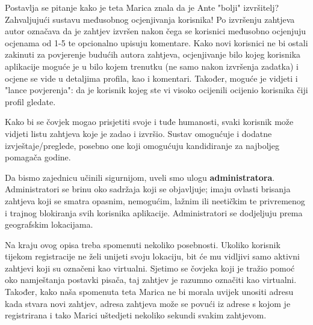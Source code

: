 	Postavlja se pitanje kako je teta Marica znala da je Ante "bolji" izvršitelj? Zahvaljujući sustavu međusobnog ocjenjivanja korisnika! Po izvršenju zahtjeva autor označava da je zahtjev izvršen nakon čega se korisnici međusobno ocjenjuju ocjenama od 1-5 te opcionalno upisuju komentare. Kako novi korisnici ne bi ostali zakinuti za povjerenje budućih autora zahtjeva, ocjenjivanje bilo kojeg korisnika aplikacije moguće je u bilo kojem trenutku (ne samo nakon izvršenja zadatka) i ocjene se vide u detaljima profila, kao i komentari. Također, moguće je vidjeti i
	"lance povjerenja": da je korisnik kojeg ste vi visoko ocijenili ocijenio korisnika
	čiji profil gledate.
	
	Kako bi se čovjek mogao prisjetiti svoje i tuđe humanosti, svaki korisnik može vidjeti listu zahtjeva koje je zadao i izvršio. Sustav
	omogućuje i dodatne izvještaje/preglede, posebno one koji omogućuju
	kandidiranje za najboljeg pomagača godine.
	
	Da bismo zajednicu učinili sigurnijom, uveli smo ulogu \textbf{administratora}. Administratori se brinu oko sadržaja koji se objavljuje; imaju ovlasti
	brisanja zahtjeva koji se smatra opasnim, nemogućim, lažnim ili neetičkim te
	privremenog i trajnog blokiranja svih korisnika aplikacije. Administratori se
	dodjeljuju prema geografskim lokacijama. 
	
	Na kraju ovog opisa treba spomenuti nekoliko posebnosti. Ukoliko korisnik tijekom registracije ne želi unijeti svoju lokaciju, bit će mu vidljivi samo aktivni zahtjevi koji su označeni kao virtualni. Sjetimo se čovjeka koji je tražio pomoć oko namještanja postavki pisača, taj zahtjev je razumno označiti kao virtualni.
	Također, kako naša spomenuta teta Marica ne bi morala uvijek unositi adresu kada stvara novi zahtjev, adresa zahtjeva može se povući iz adrese s kojom je registrirana i tako Marici uštedjeti nekoliko sekundi svakim zahtjevom.
\eject



